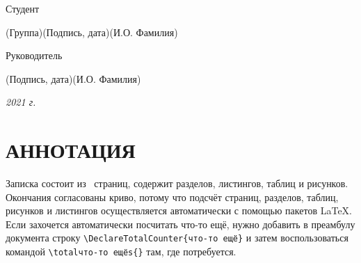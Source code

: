 \documentclass[14pt, russian]{scrartcl}
\begin{document}
\begin{titlepage}
\noindent Студент \underline{\hspace{1.5cm}} \hfill \underline{\hspace{4cm}}\quad
\underline{\hspace{4cm}}

\vspace{-2.1ex}
\noindent\hspace{9ex}\scriptsize{(Группа)}\normalsize\hspace{170pt}\hspace{2ex}\scriptsize{(Подпись, дата)}\normalsize\hspace{30pt}\hspace{6ex}\scriptsize{(И.О. Фамилия)}\normalsize

\bigskip

\noindent Руководитель  \hfill \underline{\hspace{4cm}}\quad
\underline{\hspace{4cm}}

\vspace{-2ex}
\noindent\hspace{13.5ex}\normalsize\hspace{170pt}\hspace{2ex}\scriptsize{(Подпись, дата)}\normalsize\hspace{30pt}\hspace{6ex}\scriptsize{(И.О. Фамилия)}\normalsize
\vfill

 


\begin{center}
\textsl{2021 г.}
\end{center}
\end{titlepage}


\setlength{\tabcolsep}{3pt}
\newpage
\setcounter{page}{2}
\section*{АННОТАЦИЯ}

Записка состоит из~\pageref{TotPages} страниц, содержит \totalsections{} разделов, \totallistings{} листингов, \totaltables{} таблиц и \totalfigures{} рисунков. Окончания согласованы криво, потому что подсчёт страниц, разделов, таблиц, рисунков и листингов осуществляется автоматически с помощью пакетов \LaTeX{}. Если захочется автоматически посчитать что-то ещё, нужно добавить в преамбулу документа строку \texttt{\textbackslash DeclareTotalCounter\{что-то ещё\}} и затем воспользоваться командой \texttt{\textbackslash totalчто-то ещёs\{\}} там, где потребуется.
\end{document}
